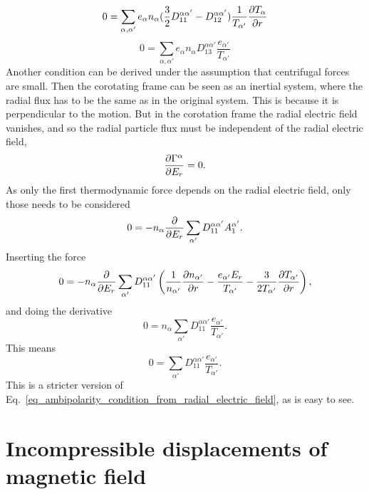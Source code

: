 \begin{equation}
  0 = \sum_{\alpha, \alpha'} e_{\alpha} n_{\alpha} (\frac{3}{2} D_{11}^{\alpha\alpha'} - D_{12}^{\alpha\alpha'}) \frac{1}{T_{\alpha'}} \frac{\partial T_{\alpha}}{\partial r}
\end{equation}
\begin{equation}
  0 = \sum_{\alpha, \alpha'} e_{\alpha} n_{\alpha} D_{13}^{\alpha\alpha'} \frac{e_{\alpha'}}{T_{\alpha'}}
\end{equation}
Another condition can be derived under the assumption that centrifugal
forces are small. Then the corotating frame can be seen as an inertial
system, where the radial flux has to be the same as in the original
system. This is because it is perpendicular to the motion. But in the
corotation frame the radial electric field vanishes, and so the radial
particle flux must be independent of the radial electric field,
\begin{equation}
  \frac{\partial \Gamma^{\alpha}}{\partial E_r} = 0.
\end{equation}
As only the first thermodynamic force depends on the radial electric
field, only those needs to be considered
\begin{equation}
  0 = - n_{\alpha} \frac{\partial }{\partial E_r} \sum_{\alpha'} D_{11}^{\alpha\alpha'} A_1^{\alpha'}.
\end{equation}
Inserting the force
\begin{equation}
  0 = - n_{\alpha} \frac{\partial }{\partial E_r} \sum_{\alpha'} D_{11}^{\alpha\alpha'} \left( \frac{1}{n_{\alpha'}} \frac{\partial n_{\alpha'}}{\partial r} - \frac{e_{\alpha'} E_r}{T_{\alpha'}} - \frac{3}{2 T_{\alpha'}} \frac{\partial T_{\alpha'}}{\partial r} \right),
\end{equation}
and doing the derivative
\begin{equation}
  0 = n_{\alpha} \sum_{\alpha'} D_{11}^{\alpha\alpha'} \frac{e_{\alpha'}}{T_{\alpha'}}.
\end{equation}
This means
\begin{equation}
  0 = \sum_{\alpha'} D_{11}^{\alpha\alpha'} \frac{e_{\alpha'}}{T_{\alpha'}}.
\end{equation}
This is a stricter version of
Eq.~\eqref{eq_ambipolarity_condition_from_radial_electric_field}, as is
easy to see.

\section{Incompressible displacements of magnetic field}

